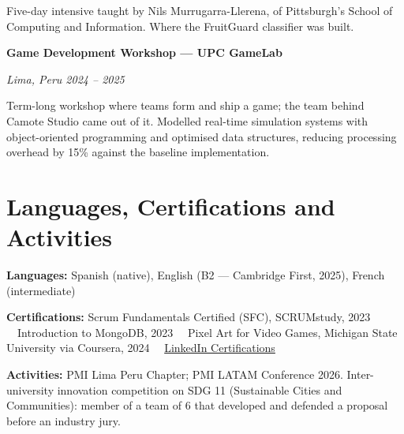 \documentclass[10pt,letterpaper]{article}
\newcommand{\entry}[2]{%
    \vspace{0.55ex}
    \textbf{#1}\par
    {\small\itshape\color{muted}#2}\par
    \vspace{0.15ex}
}
\newcommand{\skillrow}[2]{%
    \textbf{#1:} #2\par
    \vspace{0.25ex}
}
\newcommand{\urlref}[2]{\href{#1}{#2}}
\newcommand{\sep}{~\textbar\ }
\begin{document}
Five-day intensive taught by Nils Murrugarra-Llerena, of Pittsburgh's School of
Computing and Information. Where the FruitGuard classifier was built.


\entry
{Game Development Workshop --- UPC GameLab}
{Lima, Peru \textbar{} 2024 -- 2025}

Term-long workshop where teams form and ship a game; the team behind Camote
Studio came out of it. Modelled real-time simulation systems with
object-oriented programming and optimised data structures, reducing processing
overhead by 15\% against the baseline implementation.


\section{Languages, Certifications and Activities}

\skillrow{Languages}
{Spanish (native), English (B2 --- Cambridge First, 2025), French (intermediate)}

\skillrow{Certifications}
{Scrum Fundamentals Certified (SFC), SCRUMstudy, 2023%
\sep Introduction to MongoDB, 2023%
\sep Pixel Art for Video Games, Michigan State University via Coursera, 2024%
\sep \urlref{https://www.linkedin.com/in/gabriel-reyna-alvarado/details/certifications/}{LinkedIn Certifications}}

\skillrow{Activities}
{PMI Lima Peru Chapter; PMI LATAM Conference 2026.
Inter-university innovation competition on SDG 11 (Sustainable Cities and
Communities): member of a team of 6 that developed and defended a proposal
before an industry jury.}
\end{document}
